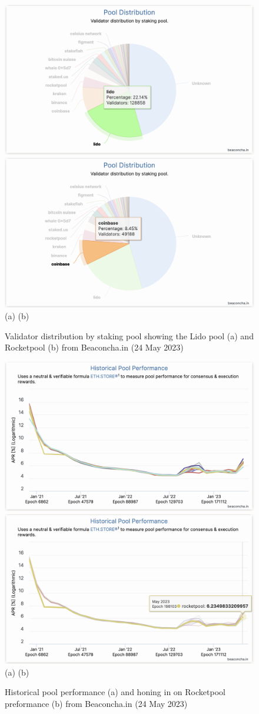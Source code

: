 \documentclass[UTF8]{article}
\begin{document}
{\begin{figure}[htbp]
\begin{center}
\includegraphics[width=0.48\linewidth]{images/bchart13c}
\includegraphics[width=0.48\linewidth]{images/bchart13d} \\
(a)\hspace{160pt}        (b)\\
\caption{Validator distribution by staking pool showing the Lido pool (a) and Rocketpool (b) from Beaconcha.in (24 May 2023)}
\label{fig:chart13c}
\end{center}
\end{figure}

\begin{figure}[htbp]
\begin{center}
\includegraphics[width=0.48\linewidth]{images/bchart14a}
\includegraphics[width=0.48\linewidth]{images/bchart14b} \\
(a)\hspace{160pt}        (b)\\
\caption{Historical pool performance (a) and honing in on Rocketpool preformance (b) from Beaconcha.in (24 May 2023)}
\label{fig:chart14}
\end{center}
\end{figure}

}
\end{document}
